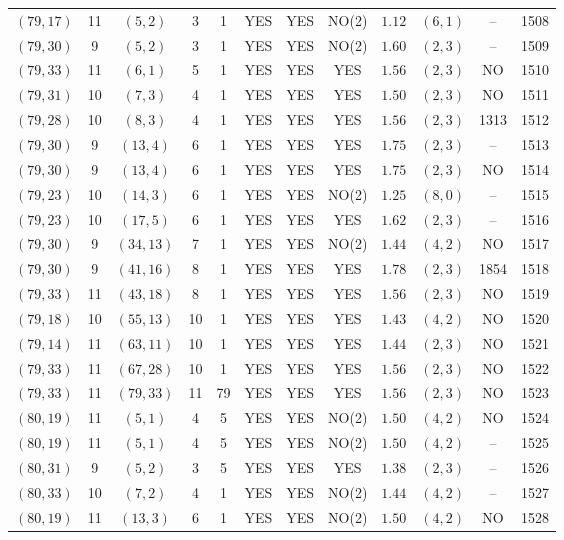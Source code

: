 \begin{longtable}{|c|c|c|c|c|c|c|c|c|c|c|c|}
$(79,17)$ & 11 & $(5,2)$ & 3 & 1 & YES & YES & NO(2) & $1.12$ & $(6,1)$ & -- & 1508\\
$(79,30)$ & 9 & $(5,2)$ & 3 & 1 & YES & YES & NO(2) & $1.60$ & $(2,3)$ & -- & 1509\\
$(79,33)$ & 11 & $(6,1)$ & 5 & 1 & YES & YES & YES & $1.56$ & $(2,3)$ & NO & 1510\\
$(79,31)$ & 10 & $(7,3)$ & 4 & 1 & YES & YES & YES & $1.50$ & $(2,3)$ & NO & 1511\\
$(79,28)$ & 10 & $(8,3)$ & 4 & 1 & YES & YES & YES & $1.56$ & $(2,3)$ & 1313 & 1512\\
$(79,30)$ & 9 & $(13,4)$ & 6 & 1 & YES & YES & YES & $1.75$ & $(2,3)$ & -- & 1513\\
$(79,30)$ & 9 & $(13,4)$ & 6 & 1 & YES & YES & YES & $1.75$ & $(2,3)$ & NO & 1514\\
$(79,23)$ & 10 & $(14,3)$ & 6 & 1 & YES & YES & NO(2) & $1.25$ & $(8,0)$ & -- & 1515\\
$(79,23)$ & 10 & $(17,5)$ & 6 & 1 & YES & YES & YES & $1.62$ & $(2,3)$ & -- & 1516\\
$(79,30)$ & 9 & $(34,13)$ & 7 & 1 & YES & YES & NO(2) & $1.44$ & $(4,2)$ & NO & 1517\\
$(79,30)$ & 9 & $(41,16)$ & 8 & 1 & YES & YES & YES & $1.78$ & $(2,3)$ & 1854 & 1518\\
$(79,33)$ & 11 & $(43,18)$ & 8 & 1 & YES & YES & YES & $1.56$ & $(2,3)$ & NO & 1519\\
$(79,18)$ & 10 & $(55,13)$ & 10 & 1 & YES & YES & YES & $1.43$ & $(4,2)$ & NO & 1520\\
$(79,14)$ & 11 & $(63,11)$ & 10 & 1 & YES & YES & YES & $1.44$ & $(2,3)$ & NO & 1521\\
$(79,33)$ & 11 & $(67,28)$ & 10 & 1 & YES & YES & YES & $1.56$ & $(2,3)$ & NO & 1522\\
$(79,33)$ & 11 & $(79,33)$ & 11 & 79 & YES & YES & YES & $1.56$ & $(2,3)$ & NO & 1523\\
$(80,19)$ & 11 & $(5,1)$ & 4 & 5 & YES & YES & NO(2) & $1.50$ & $(4,2)$ & NO & 1524\\
$(80,19)$ & 11 & $(5,1)$ & 4 & 5 & YES & YES & NO(2) & $1.50$ & $(4,2)$ & -- & 1525\\
$(80,31)$ & 9 & $(5,2)$ & 3 & 5 & YES & YES & YES & $1.38$ & $(2,3)$ & -- & 1526\\
$(80,33)$ & 10 & $(7,2)$ & 4 & 1 & YES & YES & NO(2) & $1.44$ & $(4,2)$ & -- & 1527\\
$(80,19)$ & 11 & $(13,3)$ & 6 & 1 & YES & YES & NO(2) & $1.50$ & $(4,2)$ & NO & 1528\\

\end{longtable}
